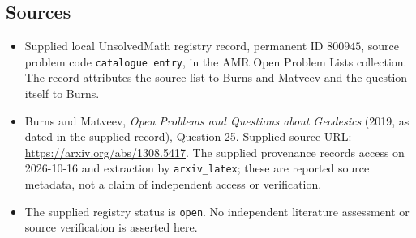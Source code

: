 \documentclass[11pt]{article}
\begin{document}
\subsection{Sources}
\begin{itemize}
\item Supplied local UnsolvedMath registry record, permanent ID \(800945\), source problem code \texttt{catalogue entry}, in the AMR Open Problem Lists collection. The record attributes the source list to Burns and Matveev and the question itself to Burns.
\item Burns and Matveev, \emph{Open Problems and Questions about Geodesics} (2019, as dated in the supplied record), Question 25. Supplied source URL: \url{https://arxiv.org/abs/1308.5417}. The supplied provenance records access on 2026-10-16 and extraction by \texttt{arxiv\_latex}; these are reported source metadata, not a claim of independent access or verification.
\item The supplied registry status is \texttt{open}. No independent literature assessment or source verification is asserted here.
\end{itemize}
\end{document}
